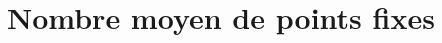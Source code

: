\documentclass[..\main.tex]{subfiles}
\begin{document}
\section{Nombre moyen de points fixes}
\end{document}
